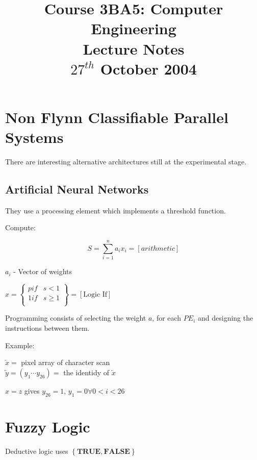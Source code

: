 \documentclass[a4paper,12pt]{article}
\begin{document}
\title{Course 3BA5: Computer Engineering \\ Lecture Notes \\ $27^{th}$ October 2004}

\maketitle

\section*{Non Flynn Classifiable Parallel Systems}

There are interesting alternative architectures still at the
experimental stage.

\subsection*{Artificial Neural Networks}

They use a processing element which implements a threshold function.


Compute:

\[ S = \sum^{n}_{i = 1} a_{i} x_{i} = [arithmetic] \]

$a_{i}$ - Vector of weights

$x = \left\{
\begin{array}{cc}
p if	& 	s < 1	\\
1 if	& 	s \geq 1	\\
\end{array}
\right\} = [\mbox{Logic If}]$


Programming consists of selecting the weight $a$, for each $PE_{i}$ and
designing the instructions between them.

Example:

$\underleftarrow{x} = $ pixel array of character scan \\

$\underleftarrow{y} = \left( y_{1} \cdots y_{26} \right) = $ the
identidy of $\underleftarrow{x}$

$x = z$ gives $y_{26} = 1$, $y_{1} = 0 \forall 0 < i < 26$

\section*{Fuzzy Logic}

Deductive logic uses $\left\{ \textbf{TRUE}, \textbf{FALSE} \right\}$
\end{document}
